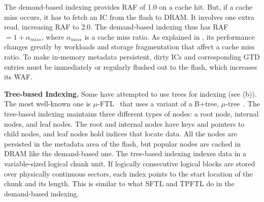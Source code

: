 The demand-based indexing provides RAF of 1.0 on a cache hit.
But, if a cache miss occurs, it has to fetch an IC from
the flash to DRAM. It involves one extra read, increasing RAF to 2.0.
The demand-based indexing thus has RAF $= 1 + \alpha_{miss}$,
where $\alpha_{miss}$ is a cache miss ratio.
As explained in , 
its performance changes greatly
by workloads and storage fragmentation that affect a cache miss ratio.
To make in-memory metadata persistent, 
dirty ICs and corresponding GTD entries must be
immediately or regularly flushed out to the flash, which increases its WAF. 


\textbf{Tree-based Indexing.}
Some have attempted to use trees for indexing 
(see (b)).  The most well-known one is
$\mu$\--FTL~\cite{uftl} that uses a variant of a B+tree, $\mu$\--tree~\cite{utree}.
The tree-based indexing maintains three different types of nodes: a root node,
internal nodes, and leaf nodes.  The root and internal nodes have keys and
pointers to child nodes, and leaf nodes hold indices that locate data.
All the nodes are persisted in the metadata area of the flash,
but popular nodes are cached in DRAM like the demand-based one.  
The tree-based indexing 
indexes data in a variable-sized logical chunk unit. If logically
consecutive logical blocks are stored over physically continuous sectors, 
each index points to the start location of the chunk and its length.
This is similar to what SFTL and TPFTL do in the demand-based indexing.


